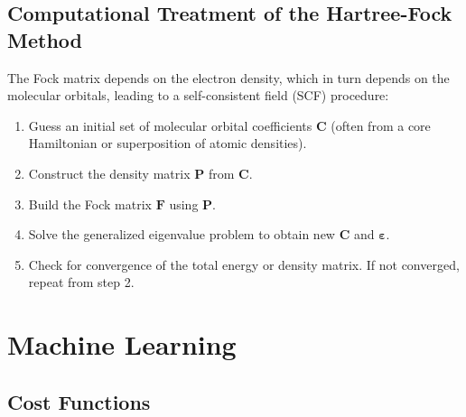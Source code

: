 \subsection{Computational Treatment of the Hartree-Fock Method}
\label{subsec:background_hf_computational}
The Fock matrix depends on the electron density, which in turn depends on the molecular orbitals, leading to a self-consistent field (SCF) procedure:
\begin{enumerate}
    \item Guess an initial set of molecular orbital coefficients $\mathbf{C}$ (often from a core Hamiltonian or superposition of atomic densities).
    \item Construct the density matrix $\mathbf{P}$ from $\mathbf{C}$.
    \item Build the Fock matrix $\mathbf{F}$ using $\mathbf{P}$.
    \item Solve the generalized eigenvalue problem to obtain new $\mathbf{C}$ and $\mathbf{\varepsilon}$.
    \item Check for convergence of the total energy or density matrix. If not converged, repeat from step 2.
\end{enumerate}

\section{Machine Learning}
\label{sec:background_ml}
\subsection{Cost Functions}
\label{subsec:background_cost_function}

